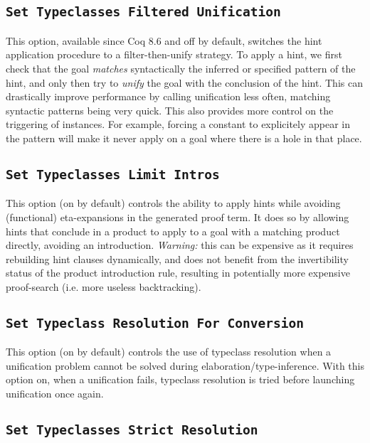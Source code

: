 \subsection{\tt Set Typeclasses Filtered Unification}

This option, available since Coq 8.6 and off by default, switches the
hint application procedure to a filter-then-unify strategy. To apply a
hint, we first check that the goal \emph{matches} syntactically the
inferred or specified pattern of the hint, and only then try to
\emph{unify} the goal with the conclusion of the hint. This can
drastically improve performance by calling unification less often,
matching syntactic patterns being very quick. This also provides more
control on the triggering of instances.  For example, forcing a constant
to explicitely appear in the pattern will make it never apply on a goal
where there is a hole in that place.

\subsection{\tt Set Typeclasses Limit Intros}

This option (on by default) controls the ability to
apply hints while avoiding (functional) eta-expansions in the generated
proof term. It does so by allowing hints that conclude in a product to
apply to a goal with a matching product directly, avoiding an
introduction. \emph{Warning:} this can be expensive as it requires
rebuilding hint clauses dynamically, and does not benefit from the
invertibility status of the product introduction rule, resulting in
potentially more expensive proof-search (i.e. more useless
backtracking).

\subsection{\tt Set Typeclass Resolution For Conversion}

This option (on by default) controls the use of typeclass resolution
when a unification problem cannot be solved during
elaboration/type-inference. With this option on, when a unification
fails, typeclass resolution is tried before launching unification once again.

\subsection{\tt Set Typeclasses Strict Resolution}


